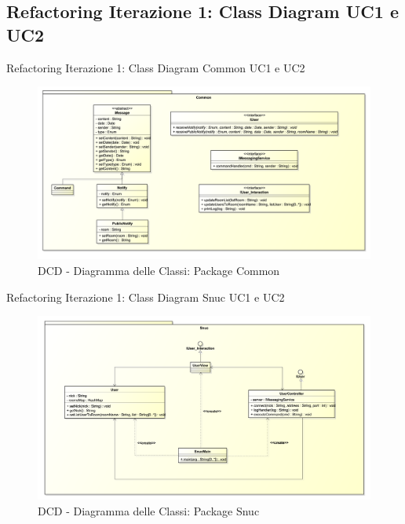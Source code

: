 \subsection{Refactoring Iterazione 1: Class Diagram UC1 e UC2}
\begin{frame} {Refactoring Iterazione 1: Class Diagram Common UC1 e UC2}
   \begin{figure}
     \includegraphics[scale=0.165]{image_astah/Iteration_1_DesignModel_Refactored/ClassDiagramCommon.png}{\centering}
     \caption{DCD - Diagramma delle Classi: Package Common }
     \label{fig_UC1_UC2_DCDR_1} 
   \end{figure}
\end{frame}

\begin{frame} {Refactoring Iterazione 1: Class Diagram Snuc UC1 e UC2}
   \begin{figure}
     \includegraphics[scale=0.155]{image_astah/Iteration_1_DesignModel_Refactored/ClassDiagramSnuc.png}{\centering}
     \caption{DCD - Diagramma delle Classi: Package Snuc }
     \label{fig_UC1_UC2_DCDR_2} 
   \end{figure}
\end{frame}

